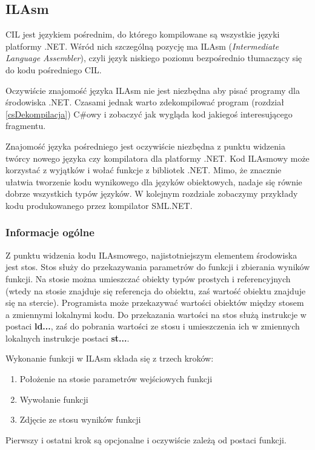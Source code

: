 ﻿\subsection{ILAsm}
\label{langIL}

CIL jest językiem pośrednim, do którego kompilowane są wszystkie języki platformy .NET. Wśród
nich szczególną pozycję ma ILAsm ({\em Intermediate Language Assembler}), czyli język
niskiego poziomu bezpośrednio tłumaczący się do kodu pośredniego CIL.

Oczywiście znajomość języka ILAsm nie jest niezbędna aby pisać programy dla środowiska .NET. 
Czasami jednak warto zdekompilować program (rozdział \ref{csDekompilacja}) C\#owy i zobaczyć
jak wygląda kod jakiegoś interesującego fragmentu.

Znajomość języka pośredniego jest oczywiście niezbędna z punktu widzenia twórcy nowego języka czy kompilatora
dla platformy .NET. Kod ILAsmowy może korzystać z wyjątków i wołać funkcje z bibliotek .NET. Mimo, że
znacznie ułatwia tworzenie kodu wynikowego dla języków obiektowych, nadaje się równie dobrze wszystkich
typów języków. W kolejnym rozdziale zobaczymy przykłady kodu produkowanego przez kompilator SML.NET.

\subsubsection{Informacje ogólne}

Z punktu widzenia kodu ILAsmowego, najistotniejszym elementem środowiska jest stos. Stos służy do przekazywania
parametrów do funkcji i zbierania wyników funkcji. Na stosie można umieszczać obiekty typów
prostych i referencyjnych (wtedy na stosie znajduje się referencja do obiektu, zaś wartość obiektu znajduje się
na stercie). Programista może przekazywać wartości obiektów między stosem a zmiennymi lokalnymi kodu.
Do przekazania wartości na stos służą instrukcje w postaci {\bf ld...}, zaś do pobrania
wartości ze stosu i umieszczenia ich w zmiennych lokalnych instrukcje postaci {\bf st...}.

Wykonanie funkcji w ILAsm składa się z trzech kroków:
\begin{enumerate}
\item Położenie na stosie parametrów wejściowych funkcji
\item Wywołanie funkcji
\item Zdjęcie ze stosu wyników funkcji
\end{enumerate}

Pierwszy i ostatni krok są opcjonalne i oczywiście zależą od postaci funkcji. 


